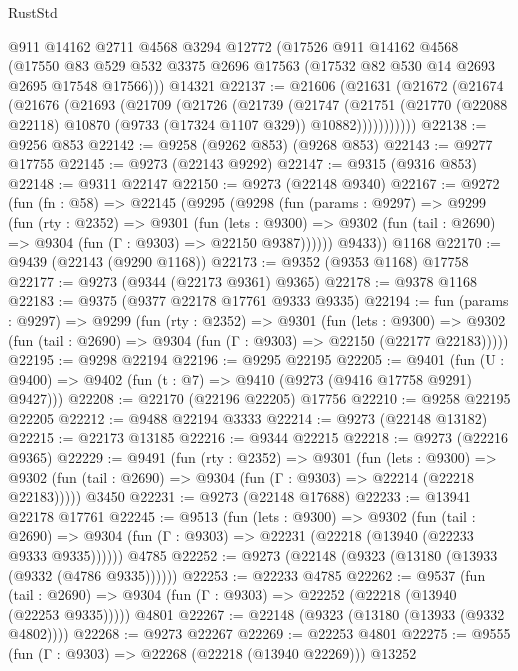 \begin{lexlean}{RustStd}
\begin{coremodule}
{\begin{coremodule}
{{{{{{{{{{{{{{{{{{{{{{{{{{{{{{{{{{{{{{{{{{{{{{{{{{{{{{{    @911
    @14162
    @2711
    @4568
    @3294
    @12772
    (@17526
      @911
      @14162
      @4568
      (@17550 @83 @529 @532 @3375 @2696 @17563 (@17532 @82 @530 @14 @2693 @2695 @17548 @17566)))
    @14321
@22137 := @21606
    (@21631
      (@21672
        (@21674
          (@21676
            (@21693
              (@21709
                (@21726
                  (@21739
                    (@21747
                      (@21751
                        (@21770 (@22088 @22118) @10870 (@9733 (@17324 @1107 @329)) @10882)))))))))))
@22138 := @9256 @853
@22142 := @9258 (@9262 @853) (@9268 @853)
@22143 := @9277 @17755
@22145 := @9273 (@22143 @9292)
@22147 := @9315 (@9316 @853)
@22148 := @9311 @22147
@22150 := @9273 (@22148 @9340)
@22167 := @9272
    (fun (fn : @58) =>
    @22145
      (@9295
        (@9298
          (fun (params : @9297) =>
          @9299
            (fun (rty : @2352) =>
            @9301
              (fun (lets : @9300) =>
              @9302 (fun (tail : @2690) => @9304 (fun (Γ : @9303) => @22150 @9387))))))
        @9433))
    @1168
@22170 := @9439 (@22143 (@9290 @1168))
@22173 := @9352 (@9353 @1168) @17758
@22177 := @9273 (@9344 (@22173 @9361) @9365)
@22178 := @9378 @1168
@22183 := @9375 (@9377 @22178 @17761 @9333 @9335)
@22194 := fun (params : @9297) =>
  @9299
    (fun (rty : @2352) =>
    @9301
      (fun (lets : @9300) =>
      @9302 (fun (tail : @2690) => @9304 (fun (Γ : @9303) => @22150 (@22177 @22183)))))
@22195 := @9298 @22194
@22196 := @9295 @22195
@22205 := @9401
    (fun (U : @9400) => @9402 (fun (t : @7) => @9410 (@9273 (@9416 @17758 @9291) @9427)))
@22208 := @22170 (@22196 @22205) @17756
@22210 := @9258 @22195 @22205
@22212 := @9488 @22194 @3333
@22214 := @9273 (@22148 @13182)
@22215 := @22173 @13185
@22216 := @9344 @22215
@22218 := @9273 (@22216 @9365)
@22229 := @9491
    (fun (rty : @2352) =>
    @9301
      (fun (lets : @9300) =>
      @9302 (fun (tail : @2690) => @9304 (fun (Γ : @9303) => @22214 (@22218 @22183)))))
    @3450
@22231 := @9273 (@22148 @17688)
@22233 := @13941 @22178 @17761
@22245 := @9513
    (fun (lets : @9300) =>
    @9302
      (fun (tail : @2690) =>
      @9304 (fun (Γ : @9303) => @22231 (@22218 (@13940 (@22233 @9333 @9335))))))
    @4785
@22252 := @9273 (@22148 (@9323 (@13180 (@13933 (@9332 (@4786 @9335))))))
@22253 := @22233 @4785
@22262 := @9537
    (fun (tail : @2690) => @9304 (fun (Γ : @9303) => @22252 (@22218 (@13940 (@22253 @9335)))))
    @4801
@22267 := @22148 (@9323 (@13180 (@13933 (@9332 @4802))))
@22268 := @9273 @22267
@22269 := @22253 @4801
@22275 := @9555 (fun (Γ : @9303) => @22268 (@22218 (@13940 @22269))) @13252
}}}}}}}}}}}}}}}}}}}}}}}}}}}}}}}}}}}}}}}}}}}}}}}}}}}}}}}
\end{coremodule}}
\end{coremodule}
\end{lexlean}
